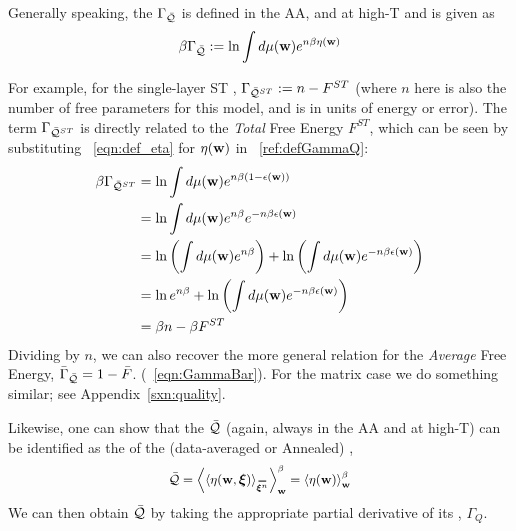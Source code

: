 {Generally speaking, the \Quality \GeneratingFunction $\Gamma_{\bar{\mathcal{Q}}}$ is defined in the AA, and at high-T and is given as
\begin{align}
  \label{ref:defGammaQ}
  \beta\Gamma_{\bar{\mathcal{Q}}} := \ln\int d\mu({\mathbf{w}}) e^{n\beta\eta({\mathbf{w}})}
\end{align}

For example, for the single-layer ST \Perceptron, $\Gamma_{\bar{\mathcal{Q}}^{ST}}:=n-F^{ST}$
(where $n$ here is also the number of free parameters for this model, and is in units of energy or error).
The term $\Gamma_{\bar{\mathcal{Q}}^{ST}}$ is directly related to the \emph{Total} Free Energy $F^{ST}$, which can be seen by substituting \EQN~\ref{eqn:def_eta}
for $\eta({\mathbf{w}})$ in \EQN~\ref{ref:defGammaQ}:
\begin{align}
  \label{ref:defGammaQtoF}
  \beta\Gamma_{\bar{\mathcal{Q}}^{ST}}
  &= \ln\int d\mu({\mathbf{w}}) e^{n\beta(1-\epsilon({\mathbf{w}}))} \\ \nonumber
    &= \ln\int d\mu({\mathbf{w}}) e^{n\beta}e^{-n\beta\epsilon({\mathbf{w}})} \\ \nonumber
    &= \ln\left(\int d\mu({\mathbf{w}}) e^{n\beta}\right)+\ln\left(\int d\mu({\mathbf{w}})e^{-n\beta\epsilon({\mathbf{w}})}\right) \\ \nonumber
   &= \ln e^{n\beta}+\ln\left(\int d\mu({\mathbf{w}})e^{-n\beta\epsilon({\mathbf{w}})}\right) \\ \nonumber
  &= \beta n-\beta F^{ST}
\end{align}
Dividing by $n$, we can also recover the more general relation for the \emph{Average} Free Energy,
$\bar{\Gamma}_{\bar{\mathcal{Q}}}=1-\bar{F}$. (\EQN~\ref{eqn:GammaBar}).
For the matrix case we do something similar; see Appendix~\ref{sxn:quality}.

Likewise, one can show that the \Quality $\bar{\mathcal{Q}}$
(again, always in the AA and at high-T) can be identified as the \ThermalAverage of the (data-averaged or Annealed)
\SelfOverlap, 
\begin{align}
  \label{eqn:Q_def_eta}
  \Q = \THRMAVGw{\langle\ETA(\WVEC,\XI)\rangle_{\AVGNDXIn}} =\THRMAVGw{\ETA(\WVEC)}
\end{align}
We can then obtain $\bar{\mathcal{Q}}$ by taking the appropriate partial derivative of its \GeneratingFunction, $\Gamma_{Q}$.

}

